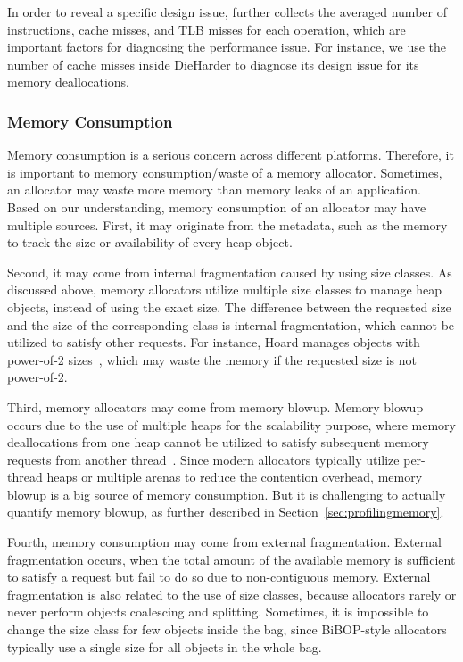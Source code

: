 In order to reveal a specific design issue, \MP{} further collects the averaged number of instructions, cache misses, and TLB misses for each operation, which are important factors for diagnosing the performance issue. For instance, we use the number of cache misses inside DieHarder to diagnose its design issue for its memory deallocations. 

\subsubsection{Memory Consumption}
\label{sec:memoryconsumption}

Memory consumption is a serious concern across different platforms. Therefore, it is important to memory consumption/waste of a memory allocator. Sometimes, an allocator may waste more memory than memory leaks of an application. Based on our understanding, memory consumption of an allocator may have multiple sources. First, it may originate from the metadata, such as the memory to track the size or availability of every heap object. 

Second, it may come from internal fragmentation caused by using size classes.  As discussed above, memory allocators utilize multiple size classes to manage heap objects, instead of using the exact size. The difference between the requested size and the size of the corresponding class is internal fragmentation, which cannot be utilized to satisfy other requests. For instance, Hoard manages objects with power-of-2 sizes~\citep{Hoard}, which may waste the memory if the requested size is not power-of-2. 
 
Third, memory allocators may come from memory blowup. Memory blowup occurs due to the use of multiple heaps for the scalability purpose, where memory deallocations from one heap cannot be utilized to satisfy subsequent memory requests from another thread~\cite{Hoard}. 
Since modern allocators typically utilize per-thread heaps or multiple arenas to reduce the contention overhead, memory blowup is a big source of memory consumption. But it is challenging to actually quantify memory blowup, as further described in Section~\ref{sec:profilingmemory}.   

Fourth, memory consumption may come from external fragmentation. External fragmentation occurs, when the total amount of the available memory is sufficient to satisfy a request but fail to do so due to non-contiguous memory. External fragmentation is also related to the use of size classes, because allocators rarely or never perform objects coalescing and splitting.
Sometimes, it is impossible to change the size class for few objects inside the bag, since BiBOP-style allocators typically use a single size for all objects in the whole bag. 

